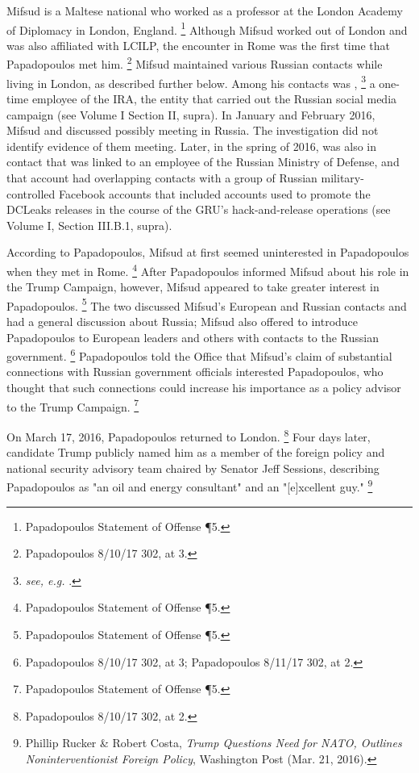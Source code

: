 Mifsud is a Maltese national who worked as a professor at the London Academy of Diplomacy in London, England.%
\footnote{Papadopoulos Statement of Offense \P 5.}
Although Mifsud worked out of London and was also affiliated with LCILP, the encounter in Rome was the first time that Papadopoulos met him.%
\footnote{Papadopoulos 8/10/17 302, at 3.}
Mifsud maintained various Russian contacts while living in London, as described further below.
Among his contacts was ,%
\footnote{\textit{see, e.g.} .
}
a one-time employee of the IRA, the entity that carried out the Russian social media campaign (see Volume I Section II, supra).
In January and February 2016, Mifsud and  discussed  possibly meeting in Russia.
The investigation did not identify evidence of them meeting.
Later, in the spring of 2016,  was also in contact  that was linked to an employee of the Russian Ministry of Defense, and that account had overlapping contacts with a group of Russian military-controlled Facebook accounts that included accounts used to promote the DCLeaks releases in the course of the GRU's hack-and-release operations (see Volume I, Section III.B.1, supra).

According to Papadopoulos, Mifsud at first seemed uninterested in Papadopoulos when they met in Rome.%
\footnote{Papadopoulos Statement of Offense \P 5.}
After Papadopoulos informed Mifsud about his role in the Trump Campaign, however, Mifsud appeared to take greater interest in Papadopoulos.%
\footnote{Papadopoulos Statement of Offense \P 5.}
The two discussed Mifsud's European and Russian contacts and had a general discussion about Russia; Mifsud also offered to introduce Papadopoulos to European leaders and others with contacts to the Russian government.%
\footnote{Papadopoulos 8/10/17 302, at 3; Papadopoulos 8/11/17 302, at 2.}
Papadopoulos told the Office that Mifsud's claim of substantial connections with Russian government officials interested Papadopoulos, who thought that such connections could increase his importance as a policy advisor to the Trump Campaign.%
\footnote{Papadopoulos Statement of Offense \P 5.}

On March 17, 2016, Papadopoulos returned to London.%
\footnote{Papadopoulos 8/10/17 302, at 2.}
Four days later, candidate Trump publicly named him as a member of the foreign policy and national security advisory team chaired by Senator Jeff Sessions, describing Papadopoulos as "an oil and energy consultant" and an "[e]xcellent guy."%
\footnote{Phillip Rucker \& Robert Costa, \textit{Trump Questions Need for NATO, Outlines Noninterventionist Foreign Policy}, Washington Post (Mar. 21, 2016).}

